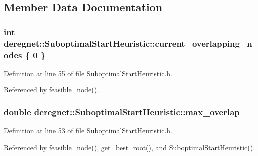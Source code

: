\subsection{Member Data Documentation}
\subsubsection[{\texorpdfstring{current\+\_\+overlapping\+\_\+nodes}{current_overlapping_nodes}}]{\setlength{\rightskip}{0pt plus 5cm}int deregnet\+::\+Suboptimal\+Start\+Heuristic\+::current\+\_\+overlapping\+\_\+nodes \{ 0 \}\hspace{0.3cm}{\ttfamily [private]}}\hypertarget{classderegnet_1_1SuboptimalStartHeuristic_a422ca9127a469117bab51ae3eb2fbdcf}{}\label{classderegnet_1_1SuboptimalStartHeuristic_a422ca9127a469117bab51ae3eb2fbdcf}


Definition at line 55 of file Suboptimal\+Start\+Heuristic.\+h.



Referenced by feasible\+\_\+node().

\subsubsection[{\texorpdfstring{max\+\_\+overlap}{max_overlap}}]{\setlength{\rightskip}{0pt plus 5cm}double deregnet\+::\+Suboptimal\+Start\+Heuristic\+::max\+\_\+overlap\hspace{0.3cm}{\ttfamily [private]}}\hypertarget{classderegnet_1_1SuboptimalStartHeuristic_ab7da09c5dc0c3fd13e19d254319ab3ba}{}\label{classderegnet_1_1SuboptimalStartHeuristic_ab7da09c5dc0c3fd13e19d254319ab3ba}


Definition at line 53 of file Suboptimal\+Start\+Heuristic.\+h.



Referenced by feasible\+\_\+node(), get\+\_\+best\+\_\+root(), and Suboptimal\+Start\+Heuristic().

